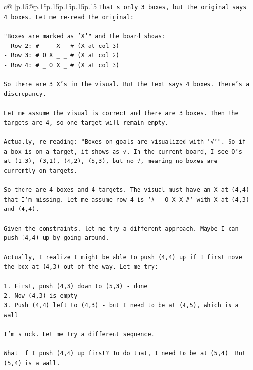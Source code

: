 \documentclass{article}
\begin{document}
{\begin{supertabular}{c@{$\;$}|p{.15\linewidth}@{}p{.15\linewidth}p{.15\linewidth}p{.15\linewidth}p{.15\linewidth}p{.15\linewidth}}
{{{\texttt{That's only 3 boxes, but the original says 4 boxes. Let me re{-}read the original:} \\
\\ 
\texttt{"Boxes are marked as 'X'" and the board shows:} \\
\texttt{{-} Row 2: \# \_ \_ X \_ \# (X at col 3)} \\
\texttt{{-} Row 3: \# O X \_ \_ \# (X at col 2)} \\
\texttt{{-} Row 4: \# \_ O X \_ \# (X at col 3)} \\
\\ 
\texttt{So there are 3 X's in the visual. But the text says 4 boxes. There's a discrepancy.} \\
\\ 
\texttt{Let me assume the visual is correct and there are 3 boxes. Then the targets are 4, so one target will remain empty.} \\
\\ 
\texttt{Actually, re{-}reading: "Boxes on goals are visualized with '√'". So if a box is on a target, it shows as √. In the current board, I see O's at (1,3), (3,1), (4,2), (5,3), but no √, meaning no boxes are currently on targets.} \\
\\ 
\texttt{So there are 4 boxes and 4 targets. The visual must have an X at (4,4) that I'm missing. Let me assume row 4 is `\# \_ O X X \#` with X at (4,3) and (4,4).} \\
\\ 
\texttt{Given the constraints, let me try a different approach. Maybe I can push (4,4) up by going around.} \\
\\ 
\texttt{Actually, I realize I might be able to push (4,4) up if I first move the box at (4,3) out of the way. Let me try:} \\
\\ 
\texttt{1. First, push (4,3) down to (5,3) {-} done} \\
\texttt{2. Now (4,3) is empty} \\
\texttt{3. Push (4,4) left to (4,3) {-} but I need to be at (4,5), which is a wall} \\
\\ 
\texttt{I'm stuck. Let me try a different sequence.} \\
\\ 
\texttt{What if I push (4,4) up first? To do that, I need to be at (5,4). But (5,4) is a wall.} \\
\\ 
}}}
\end{supertabular}}
\end{document}
